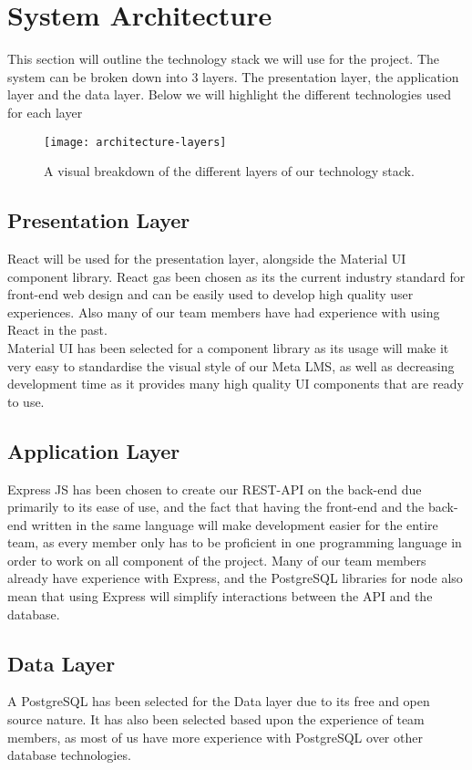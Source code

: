 \section{System Architecture}
This section will outline the technology stack we will use for the project. The system can be broken down into 3 layers. The presentation layer, the application layer and the data layer. Below we will highlight the different technologies used for each layer

\begin{figure}[h]
    \centering
    \texttt{[image: architecture-layers]}
    \caption{A visual breakdown of the different layers of our technology stack.}
\end{figure}

\subsection{Presentation Layer}
React will be used for the presentation layer, alongside the Material UI component library. React gas been chosen as its the current industry standard for front-end web design and can be easily used to develop high quality user experiences. Also many of our team members have had experience with using React in the past.\\
Material UI has been selected for a component library as its usage will make it very easy to standardise the visual style of our Meta LMS, as well as decreasing development time as it provides many high quality UI components that are ready to use. 

\subsection{Application Layer}
Express JS has been chosen to create our REST-API on the back-end due primarily to its ease of use, and the fact that having the front-end and the back-end written in the same language will make development easier for the entire team, as every member only has to be proficient in one programming language in order to work on all component of the project. Many of our team members already have experience with Express, and the PostgreSQL libraries for node also mean that using Express will simplify interactions between the API and the database.

\subsection{Data Layer}
A PostgreSQL has been selected for the Data layer due to its free and open source nature. It has also been selected based upon the experience of team members, as most of us have more experience with PostgreSQL over other database technologies.
